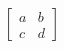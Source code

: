\documentclass[preview]{standalone}
\begin{document}
    \begin{align*}\begin{bmatrix} a & b \\ c & d \end{bmatrix}\end{align*}

    
\end{document}
